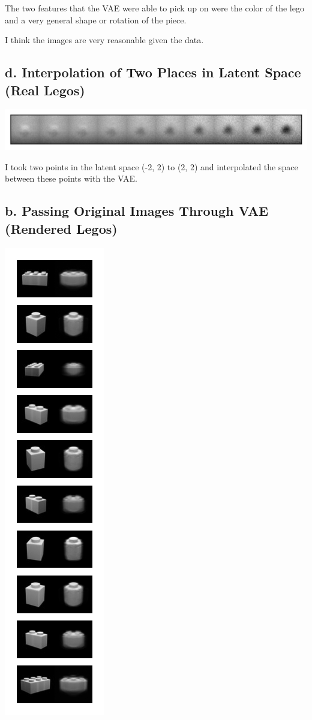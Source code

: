 \documentclass{article}
\begin{document}
The two features that the VAE were able to pick up on were the color
of the lego and a very general shape or rotation of the piece.

I think the images are very reasonable given the data.

\subsection*{d. Interpolation of Two Places in Latent Space (Real Legos)}
\begin{center}
  \includegraphics[scale=0.9]{interpolation-lego-dataset}
\end{center}

I took two points in the latent space (-2, 2) to (2, 2) and interpolated
the space between these points with the VAE.


\subsection*{b. Passing Original Images Through VAE (Rendered Legos)}
\begin{center}
  \includegraphics[scale=1]{10_original-lego-blender-4}
\end{center}
\end{document}
